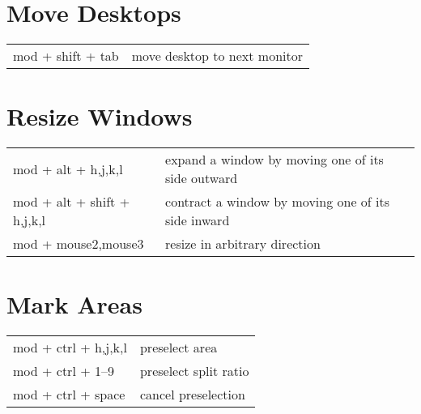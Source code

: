 \documentclass[
    a4paper,
    10pt,
    notitlepage,
    egregdoesnotlikesansseriftitles
]{scrartcl}
\begin{document}
\section{Move Desktops}
\begin{tabular}{p{4cm}l}
    mod + shift + tab     & move desktop to next monitor
\end{tabular}

\section{Resize Windows}
\begin{tabular}{p{4cm}l}
    mod + alt + h,j,k,l   & expand a window by moving one of its side outward        \\
    mod + alt + shift + h,j,k,l & contract a window by moving one of its side inward \\
    mod + mouse2,mouse3   & resize in arbitrary direction
\end{tabular}

\section{Mark Areas}
\begin{tabular}{p{4cm}l}
    mod + ctrl + h,j,k,l  & preselect area                    \\
    mod + ctrl + 1--9      & preselect split ratio            \\
    mod + ctrl + space    & cancel preselection
\end{tabular}

\end{document}
